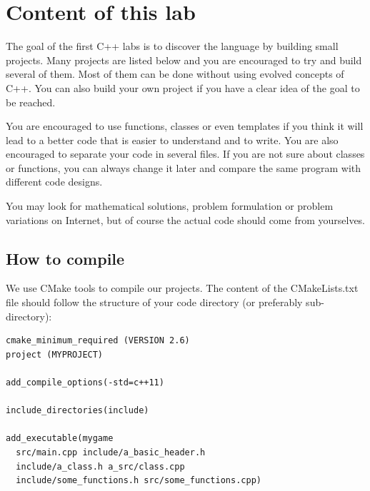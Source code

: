 \documentclass{ecnreport}
\begin{document}


\newcommand{\involves}[1]{
\item {\bf C++ skills:} #1
}

\newcommand{\aitip}[1]{
\item {\bf AI tips:} #1
}


\section{Content of this lab}

The goal of the first C++ labs is to discover the language by building small projects.
Many projects are listed below and you are encouraged to try and build several of them. Most of them can be done without using evolved concepts of C++. You can also build your own project if you have a clear idea of the goal to be reached.

You are encouraged to use functions, classes or even templates if you think it will lead to a better code that is easier to understand and to write.
You are also encouraged to separate your code in several files. If you are not sure about classes or functions, you can always change it later and compare
the same program with different code designs.

You may look for mathematical solutions, problem formulation or problem variations on Internet, but of course the actual code should come from yourselves.

\subsection{How to compile}

We use CMake tools to compile our projects.
The content of the CMakeLists.txt file should follow the structure of your code directory (or preferably sub-directory):
\begin{center}
\begin{minipage}{.4\linewidth}
\end{minipage}
\begin{minipage}{.55\linewidth}\pythonstyle
\begin{lstlisting}
cmake_minimum_required (VERSION 2.6)
project (MYPROJECT)

add_compile_options(-std=c++11)

include_directories(include)

add_executable(mygame 
  src/main.cpp include/a_basic_header.h
  include/a_class.h a_src/class.cpp
  include/some_functions.h src/some_functions.cpp)
\end{lstlisting} \end{minipage}
\end{center}
\end{document}
